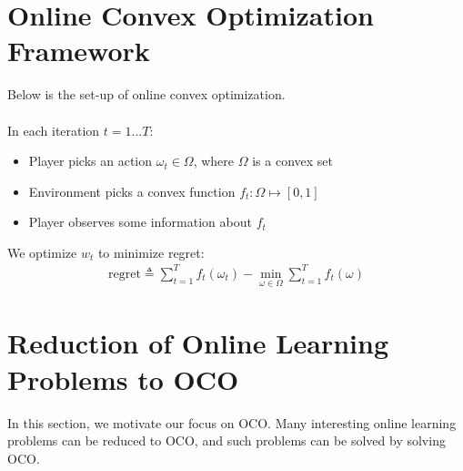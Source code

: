 \documentclass[11pt]{article}
\newcommand{\1}{\mathbb{I}} %
\begin{document}
\section{Online Convex Optimization Framework}
Below is the set-up of online convex optimization.\\\\
In each iteration $t=1...T$:
\begin{itemize}
\item Player picks an action $\omega_t \in \Omega$, where $\Omega$ is a convex set
\item Environment picks a convex function $f_t: \Omega \mapsto [0,1]$
\item Player observes some information about $f_t$
\end{itemize}
We optimize $w_t$ to minimize regret:
\begin{align*}
\text{regret} \triangleq \sum_{t=1}^Tf_t(\omega_t) - \min_{\omega \in \Omega}\sum_{t=1}^T f_t(\omega)
\end{align*}


\section{Reduction of Online Learning Problems to OCO}
In this section, we motivate our focus on OCO. Many interesting online learning problems can be reduced to OCO, and such problems can be solved by solving OCO. 
\end{document}
